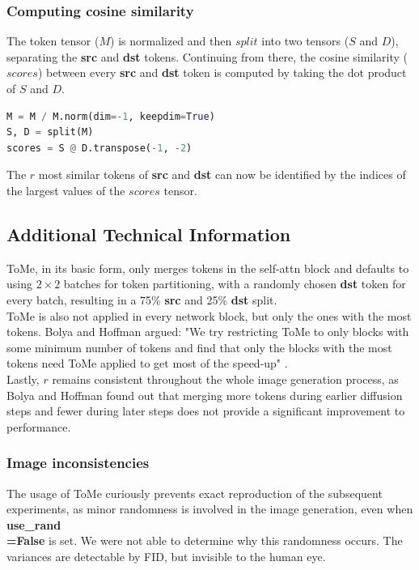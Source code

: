 \subsubsection*{Computing cosine similarity}
The token tensor (\(M\)) is normalized and then \(split\) into two tensors (\(S\) and \(D\)), separating the \textbf{src} and \textbf{dst} tokens.
Continuing from there, the cosine similarity (\(scores\)) between every \textbf{src} and \textbf{dst} token is computed by taking the dot product of \(S\) and \(D\).
\begin{lstlisting}[language=Python]
M = M / M.norm(dim=-1, keepdim=True)
S, D = split(M)
scores = S @ D.transpose(-1, -2)
\end{lstlisting}
The \(r\) most similar tokens of \textbf{src} and \textbf{dst} can now be identified by the indices of the largest values of the \(scores\) tensor.



\subsection{Additional Technical Information}
ToMe, in its basic form, only merges tokens in the self-attn block and defaults to using \(2 \times 2\) batches for token partitioning, with a randomly chosen \textbf{dst} token for every batch, resulting in a 75\% \textbf{src} and 25\% \textbf{dst} split. \\
ToMe is also not applied in every network block, but only the ones with the most tokens. Bolya and Hoffman argued:
"We try restricting ToMe to only blocks with some minimum number of tokens and find that only the blocks with the most tokens need ToMe applied to get most of the speed-up" \cite{bolya2023tomesd}.\\
Lastly, \(r\) remains consistent throughout the whole image generation process, as Bolya and Hoffman found out that merging more tokens during earlier diffusion steps and fewer during later steps does not provide a significant improvement to performance.



\subsubsection*{Image inconsistencies}
The usage of ToMe curiously prevents exact reproduction of the subsequent experiments, as minor randomness is involved in the image generation, even when \textbf{use\_rand\\=False} is set. We were not able to determine why this randomness occurs. The
variances are detectable by FID, but invisible to the human eye.
